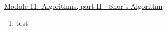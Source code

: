 \documentclass[main.tex]{subfiles}
\begin{document}
\href{https://www2.seas.gwu.edu/~simhaweb/quantum/modules/module11/module11.html}{Module 11: Algorithms, part II - Shor's Algorithm}

\begin{enumerate}
    
    \item test
    
\end{enumerate}
\end{document}
